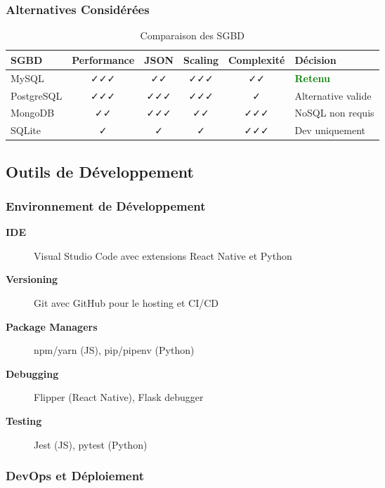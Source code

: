 \subsubsection{Alternatives Considérées}

\begin{table}[H]
\centering
\begin{tabular}{|l|c|c|c|c|l|}
\hline
\textbf{SGBD} & \textbf{Performance} & \textbf{JSON} & \textbf{Scaling} & \textbf{Complexité} & \textbf{Décision} \\
\hline
MySQL & ✓✓✓ & ✓✓ & ✓✓✓ & ✓✓ & \textcolor{green}{\textbf{Retenu}} \\
PostgreSQL & ✓✓✓ & ✓✓✓ & ✓✓✓ & ✓ & Alternative valide \\
MongoDB & ✓✓ & ✓✓✓ & ✓✓ & ✓✓✓ & NoSQL non requis \\
SQLite & ✓ & ✓ & ✓ & ✓✓✓ & Dev uniquement \\
\hline
\end{tabular}
\caption{Comparaison des SGBD}
\end{table}

\subsection{Outils de Développement}

\subsubsection{Environnement de Développement}

\begin{description}
    \item[\textbf{IDE}] Visual Studio Code avec extensions React Native et Python
    \item[\textbf{Versioning}] Git avec GitHub pour le hosting et CI/CD
    \item[\textbf{Package Managers}] npm/yarn (JS), pip/pipenv (Python)
    \item[\textbf{Debugging}] Flipper (React Native), Flask debugger
    \item[\textbf{Testing}] Jest (JS), pytest (Python)
\end{description}

\subsubsection{DevOps et Déploiement}

